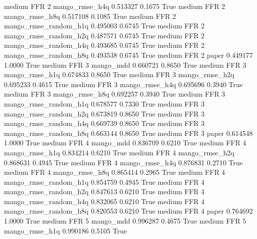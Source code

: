     medium      FFR                 2        mango_rmse_h4q   0.513327      0.1675    True
    medium      FFR                 2        mango_rmse_h8q   0.517108      0.1085    True
    medium      FFR                 2 mango_rmse_random_h1q   0.495003      0.6745    True
    medium      FFR                 2 mango_rmse_random_h2q   0.487571      0.6745    True
    medium      FFR                 2 mango_rmse_random_h4q   0.493685      0.6745    True
    medium      FFR                 2 mango_rmse_random_h8q   0.493538      0.6745    True
    medium      FFR                 2                 paper   0.449177      1.0000    True
    medium      FFR                 3             mango_mdd   0.660721      0.8650    True
    medium      FFR                 3        mango_rmse_h1q   0.674833      0.8650    True
    medium      FFR                 3        mango_rmse_h2q   0.695233      0.4615    True
    medium      FFR                 3        mango_rmse_h4q   0.695696      0.3940    True
    medium      FFR                 3        mango_rmse_h8q   0.692257      0.3940    True
    medium      FFR                 3 mango_rmse_random_h1q   0.678577      0.7330    True
    medium      FFR                 3 mango_rmse_random_h2q   0.673819      0.8650    True
    medium      FFR                 3 mango_rmse_random_h4q   0.669739      0.8650    True
    medium      FFR                 3 mango_rmse_random_h8q   0.663144      0.8650    True
    medium      FFR                 3                 paper   0.614548      1.0000    True
    medium      FFR                 4             mango_mdd   0.836709      0.6210    True
    medium      FFR                 4        mango_rmse_h1q   0.834214      0.6210    True
    medium      FFR                 4        mango_rmse_h2q   0.868631      0.4945    True
    medium      FFR                 4        mango_rmse_h4q   0.876831      0.2710    True
    medium      FFR                 4        mango_rmse_h8q   0.865414      0.2965    True
    medium      FFR                 4 mango_rmse_random_h1q   0.854759      0.4945    True
    medium      FFR                 4 mango_rmse_random_h2q   0.847613      0.6210    True
    medium      FFR                 4 mango_rmse_random_h4q   0.832065      0.6210    True
    medium      FFR                 4 mango_rmse_random_h8q   0.820553      0.6210    True
    medium      FFR                 4                 paper   0.764692      1.0000    True
    medium      FFR                 5             mango_mdd   0.996287      0.4675    True
    medium      FFR                 5        mango_rmse_h1q   0.990186      0.5105    True
